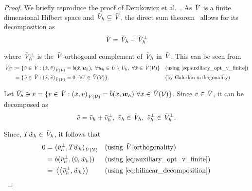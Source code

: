 \begin{proof}

We briefly reproduce the proof of Demkowicz et al.~\cite[Section ]{Demkowicz2014_overview}. As
$\tilde{\mathit{{{V}}}}$ is a finite dimensional Hilbert space and $\tilde{\mathit{{{V}}}}_h \subseteq \tilde{\mathit{{{V}}}}$, the direct sum
theorem~\cite[Theorem ]{Ciarlet2013} allows for its decomposition as
\begin{align}
\tilde{\mathit{{{V}}}} = \tilde{\mathit{{{V}}}}_h + \tilde{\mathit{{{V}}}}_h^{\bot}
\end{align}

where $\tilde{\mathit{{{V}}}}_h^{\bot}$ is the $\tilde{\mathit{{{V}}}}$-orthogonal complement of $\tilde{\mathit{{{V}}}}_h$ in $\tilde{\mathit{{{V}}}}$. This can be
seen from 
\begin{align}
\afspace{V}_h^{\bot}
\coloneqq\ & \{ \tilde{v} \in \afspace{V} :
(\tilde{x},\tilde{v})_{\afspace{V}(\fe{V})} = b(\tilde{x},\varg{u}_h),\ \forall \varg{u}_h \in \fspace{U} \setminus
\fspace{U}_h,\ \forall \tilde{x} \in \afspace{V}(\fe{V}) \}
 && (\text{using}~\eqref{eq:auxiliary_opt_v_finite}) \nonumber \\
=\ & \{ \tilde{v} \in \afspace{V} :
(\tilde{x},\tilde{v})_{\afspace{V}(\fe{V})} = 0,\ \forall \tilde{x} \in \afspace{V}(\fe{V}) \}.
 && (\text{by Galerkin orthogonality}) \nonumber
\end{align}


Let $\bar{V}_h \ni \bar{v} = \{ v \in \tilde{\mathit{{{V}}}} : (\tilde{x},v)_{\tilde{\mathit{{{V}}}}(\mathcal{{{V}}})} = \bar{b}(\tilde{x},\mathit{\bm{{w}}}_h)\ \forall
\tilde{x} \in \tilde{\mathit{{{V}}}}(\mathcal{{{V}}}) \}$. Since $\bar{v} \in \tilde{\mathit{{{V}}}}$, it can be decomposed as
\begin{align}
\bar{v} = \bar{v}_h + \bar{v}_h^{\bot},\ \bar{v}_h \in \afspace{V}_h,\ \bar{v}_h^{\bot} \in \afspace{V}_h^{\bot}.
\end{align}

Since, $T\hat{w}_h \in \tilde{\mathit{{{V}}}}_h$, it follows that
\begin{align}
0 
=\ & (\bar{v}_h^{\bot},T\hat{w}_h)_{\tilde{\mathit{{{V}}}}(\mathcal{{{V}}})} && (\text{using}\ \tilde{\mathit{{{V}}}}\text{-orthogonality}) \nonumber \\
=\ & b(\bar{v}_h^{\bot},(0,\hat{w}_h)) && (\text{using}~\eqref{eq:auxiliary_opt_v_finite}) \nonumber \\
=\ & \left<\left< \bar{v}_h^{\bot},\hat{w}_h \right>\right> && (\text{using}~\eqref{eq:bilinear_decomposition}) \label{eq:weak_continuous_v}
\end{align}


\end{proof}
